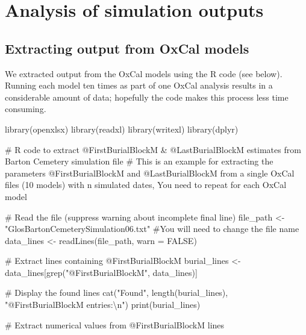 \documentclass[
]{agujournal2019}
\newenvironment{Shaded}{\begin{snugshade}}{\end{snugshade}}
\newcommand{\AttributeTok}[1]{\textcolor[rgb]{0.40,0.45,0.13}{#1}}
\newcommand{\CommentTok}[1]{\textcolor[rgb]{0.37,0.37,0.37}{#1}}
\newcommand{\ConstantTok}[1]{\textcolor[rgb]{0.56,0.35,0.01}{#1}}
\newcommand{\FunctionTok}[1]{\textcolor[rgb]{0.28,0.35,0.67}{#1}}
\newcommand{\NormalTok}[1]{\textcolor[rgb]{0.00,0.23,0.31}{#1}}
\newcommand{\OtherTok}[1]{\textcolor[rgb]{0.00,0.23,0.31}{#1}}
\newcommand{\SpecialCharTok}[1]{\textcolor[rgb]{0.37,0.37,0.37}{#1}}
\newcommand{\StringTok}[1]{\textcolor[rgb]{0.13,0.47,0.30}{#1}}
\begin{document}
\section{Analysis of simulation
outputs}\label{analysis-of-simulation-outputs}

\subsection{Extracting output from OxCal
models}\label{extracting-output-from-oxcal-models}

We extracted output from the OxCal models using the R code (see below).
Running each model ten times as part of one OxCal analysis results in a
considerable amount of data; hopefully the code makes this process less
time consuming.

\begin{Shaded}
\begin{Highlighting}[]
\FunctionTok{library}\NormalTok{(openxlsx)}
\FunctionTok{library}\NormalTok{(readxl)}
\FunctionTok{library}\NormalTok{(writexl)}
\FunctionTok{library}\NormalTok{(dplyr)}


\CommentTok{\# R code to extract @FirstBurialBlockM \& @LastBurialBlockM estimates from Barton Cemetery simulation file}
\CommentTok{\# This is an example for extracting the parameters @FirstBurialBlockM and @LastBurialBlockM from a single OxCal files (10 models) with n simulated dates, You need to repeat for each OxCal model}

\CommentTok{\# Read the file (suppress warning about incomplete final line)}
\NormalTok{file\_path }\OtherTok{\textless{}{-}} \StringTok{"GlosBartonCemeterySimulation06.txt"} \CommentTok{\#You will need to change the file name}
\NormalTok{data\_lines }\OtherTok{\textless{}{-}} \FunctionTok{readLines}\NormalTok{(file\_path, }\AttributeTok{warn =} \ConstantTok{FALSE}\NormalTok{)}

\CommentTok{\# Extract lines containing @FirstBurialBlockM}
\NormalTok{burial\_lines }\OtherTok{\textless{}{-}}\NormalTok{ data\_lines[}\FunctionTok{grep}\NormalTok{(}\StringTok{"@FirstBurialBlockM"}\NormalTok{, data\_lines)]}

\CommentTok{\# Display the found lines}
\FunctionTok{cat}\NormalTok{(}\StringTok{"Found"}\NormalTok{, }\FunctionTok{length}\NormalTok{(burial\_lines), }\StringTok{"@FirstBurialBlockM entries:}\SpecialCharTok{\textbackslash{}n}\StringTok{"}\NormalTok{)}
\FunctionTok{print}\NormalTok{(burial\_lines)}

\CommentTok{\# Extract numerical values from @FirstBurialBlockM lines}


\end{Highlighting}
\end{Shaded}
\end{document}

